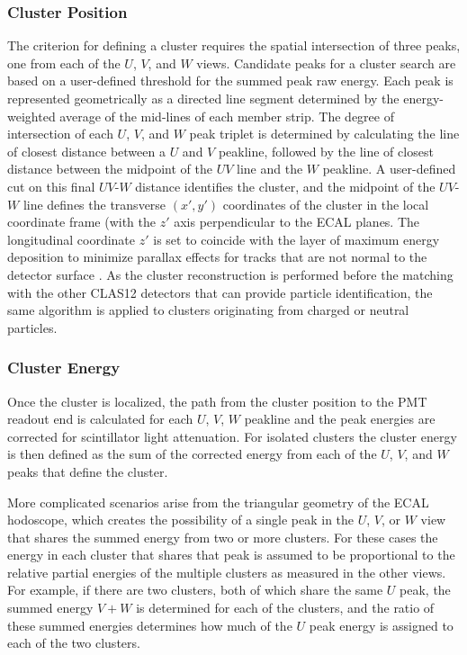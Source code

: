 \subsubsection {Cluster Position}

The criterion for defining a cluster requires the spatial intersection of three peaks, one from each of the $U$,
$V$, and $W$ views. Candidate peaks for a cluster search are based on a user-defined threshold for the
summed peak raw energy. Each peak is represented geometrically as a directed line segment determined by the
energy-weighted average of the mid-lines of each member strip. The degree of intersection of each $U$, $V$,
and $W$ peak triplet is determined by calculating the line of closest distance between a $U$ and $V$ peakline,
followed by the line of closest distance between the midpoint of the $UV$ line and the $W$ peakline. A
user-defined cut on this final $UV$-$W$ distance identifies the cluster, and the midpoint of the $UV$-$W$
line defines the transverse $(x',y')$ coordinates of the cluster in the local coordinate frame (with the $z'$
axis perpendicular to the ECAL planes. The longitudinal coordinate $z'$ is set to coincide with the layer of
maximum energy deposition to minimize parallax effects for tracks that are not normal to the detector surface
\cite{ecal-nim}. As the cluster reconstruction is performed before the matching with the other CLAS12
detectors that can provide particle identification, the same algorithm is applied to clusters originating from
charged or neutral particles.

\subsubsection {Cluster Energy}

Once the cluster is localized, the path from the cluster position to the PMT readout end is calculated for each $U$,
$V$, $W$ peakline and the peak energies are corrected for scintillator light attenuation.  For isolated clusters
the cluster energy is then defined as the sum of the corrected energy from each of the $U$, $V$, and $W$ peaks
that define the cluster.

More complicated scenarios arise from the triangular geometry of the ECAL hodoscope, which creates the
possibility of a single peak in the $U$, $V$, or $W$ view that shares the summed energy from two or more
clusters.  For these cases the energy in each cluster that shares that peak is assumed to be proportional to the
relative partial energies of the multiple clusters as measured in the other views.  For example, if there are two
clusters, both of which share the same $U$ peak, the summed energy $V+W$ is determined for each of the
clusters, and the ratio of these summed energies determines how much of the $U$ peak energy is assigned to
each of the two clusters.

